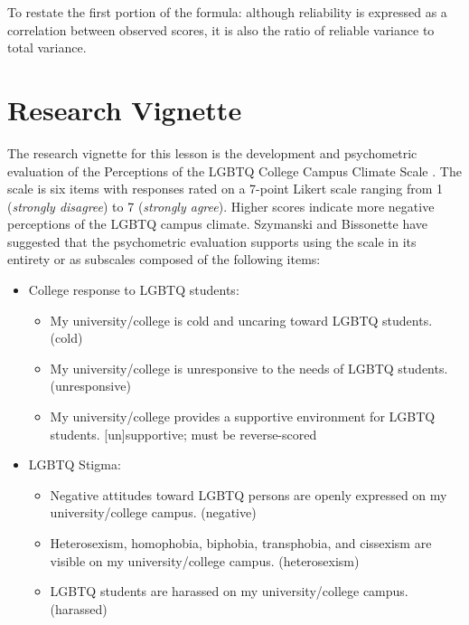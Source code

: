\documentclass[
  english,
]{book}
\providecommand{\tightlist}{%
  \setlength{\itemsep}{0pt}\setlength{\parskip}{0pt}}
\begin{document}
To restate the first portion of the formula: although reliability is expressed as a correlation between observed scores, it is also the ratio of reliable variance to total variance.

\hypertarget{research-vignette-2}{%
\section{Research Vignette}\label{research-vignette-2}}

The research vignette for this lesson is the development and psychometric evaluation of the Perceptions of the LGBTQ College Campus Climate Scale \citep{szymanski_perceptions_2020}. The scale is six items with responses rated on a 7-point Likert scale ranging from 1 (\emph{strongly disagree}) to 7 (\emph{strongly agree}). Higher scores indicate more negative perceptions of the LGBTQ campus climate. Szymanski and Bissonette \citeyearpar{szymanski_perceptions_2020} have suggested that the psychometric evaluation supports using the scale in its entirety or as subscales composed of the following items:

\begin{itemize}
\tightlist
\item
  College response to LGBTQ students:

  \begin{itemize}
  \tightlist
  \item
    My university/college is cold and uncaring toward LGBTQ students. (cold)
  \item
    My university/college is unresponsive to the needs of LGBTQ students. (unresponsive)
  \item
    My university/college provides a supportive environment for LGBTQ students. {[}un{]}supportive; must be reverse-scored
  \end{itemize}
\item
  LGBTQ Stigma:

  \begin{itemize}
  \tightlist
  \item
    Negative attitudes toward LGBTQ persons are openly expressed on my university/college campus. (negative)
  \item
    Heterosexism, homophobia, biphobia, transphobia, and cissexism are visible on my university/college campus. (heterosexism)
  \item
    LGBTQ students are harassed on my university/college campus. (harassed)
  \end{itemize}
\end{itemize}
\end{document}
